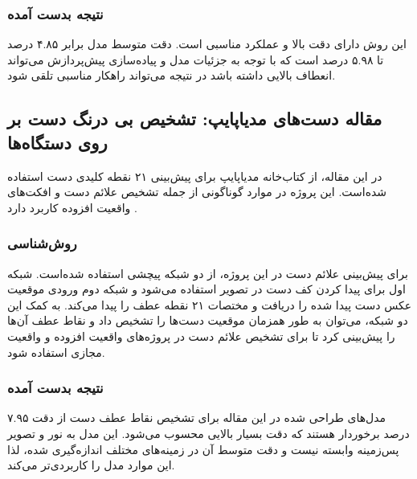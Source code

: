 \subsubsection{نتیجه بدست آمده}
این روش دارای دقت بالا و عملکرد مناسبی است. دقت متوسط مدل برابر  ۴.۸۵ درصد تا ۵.۹۸ درصد است که با توجه به جزئیات مدل و پیاده‌سازی پیش‌پردازش می‌تواند انعطاف بالایی داشته باشد در نتیجه می‌تواند راهکار مناسبی تلقی شود.

\pagebreak

\subsection[مقاله دست‌های مدیاپایپ: تشخیص بی درنگ دست بر روی دستگاه‌ها]{مقاله دست‌های مدیاپایپ: تشخیص بی درنگ دست بر روی دستگاه‌ها \protect{}}
در این مقاله، از کتاب‌خانه مدیا‌پایپ  برای پیش‌بینی ۲۱ نقطه کلیدی دست استفاده‌ ‌شده‌است. این پروژه در موارد گوناگونی از جمله تشخیص علائم دست و افکت‌های واقعیت افزوده  کاربرد دارد \cite{zhang2020mediapipe}.

\subsubsection{روش‌شناسی}
 برای پیش‌بینی علائم دست  در این پروژه، از دو شبکه  پیچشی استفاده شده‌است. شبکه اول برای پیدا کردن کف دست در تصویر استفاده می‌شود و شبکه دوم ورودی 
موقعیت عکس دست پیدا شده را دریافت و مختصات ۲۱ نقطه عطف را پیدا می‌کند. به کمک این دو شبکه، می‌توان به طور همزمان موقعیت دست‌ها را تشخیص داد و 
نقاط عطف آن‌ها را پیش‌بینی کرد تا برای تشخیص علائم دست در پروژه‌های واقعیت افزوده و واقعیت مجازی استفاده شود.

\subsubsection{نتیجه بدست آمده}
مدل‌های طراحی شده در این مقاله برای تشخیص نقاط عطف دست از دقت ۷.۹۵ درصد برخوردار هستند که دقت بسیار بالایی محسوب می‌شود. این مدل به نور و تصویر پس‌زمینه 
وابسته نیست و دقت متوسط آن در زمینه‌های مختلف اندازه‌گیری شده، لذا این موارد مدل را کاربردی‌تر می‌کند.




